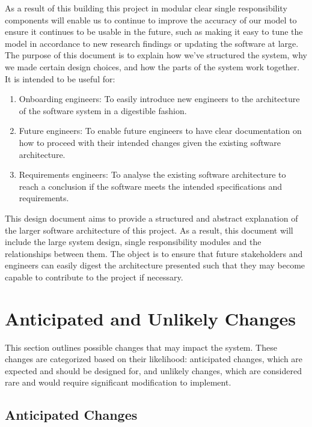 \documentclass[12pt, titlepage]{article}
\begin{document}
As a result of this building this project in modular clear single responsibility components will enable us to continue to improve the accuracy of our model to ensure it continues to be usable in the future, such as making it easy to tune the model in accordance to new research findings or updating the software at large.
The purpose of this document is to explain how we’ve structured the system, why we made certain design choices, and how the parts of the system work together. It is intended to be useful for:

\begin{enumerate}
  \item Onboarding engineers: To easily introduce new engineers to the architecture of the software system in a digestible fashion.
  \item Future engineers: To enable future engineers to have clear documentation on how to proceed with their intended changes given the existing software architecture.
  \item Requirements engineers: To analyse the existing software architecture to reach a conclusion if the software meets the intended specifications and requirements.
\end{enumerate}

This design document aims to provide a structured and abstract explanation of the larger software architecture of this project. As a result, this document will include the large system design, single responsibility modules and the relationships between them.
The object is to ensure that future stakeholders and engineers can easily digest the architecture presented such that they may become capable to contribute to the project if necessary.


\section{Anticipated and Unlikely Changes} \label{SecChange}

This section outlines possible changes that may impact the system. These changes are categorized based on their likelihood: anticipated changes, which are expected and should be designed for, and unlikely changes, which are considered rare and would require significant modification to implement.


\subsection{Anticipated Changes} \label{SecAchange}
\end{document}

